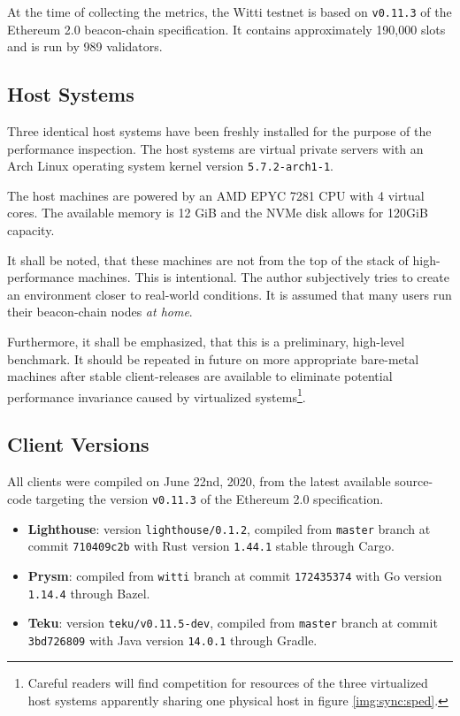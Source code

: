 \documentclass[twoside,twocolumn]{article}
\begin{document}
At the time of collecting the metrics, the Witti testnet is based on \texttt{v0.11.3} of the Ethereum 2.0 beacon-chain specification. It contains approximately 190,000 slots and is run by 989 validators.\par

\subsection{Host Systems}
Three identical host systems have been freshly installed for the purpose of the performance inspection. The host systems are virtual private servers with an Arch Linux operating system kernel version \texttt{5.7.2-arch1-1}.\par

The host machines are powered by an AMD EPYC 7281 CPU with 4 virtual cores. The available memory is 12 GiB and the NVMe disk allows for 120GiB capacity.\par

It shall be noted, that these machines are not from the top of the stack of high-performance machines. This is intentional. The author subjectively tries to create an environment closer to real-world conditions. It is assumed that many users run their beacon-chain nodes \textit{at home}.\par

Furthermore, it shall be emphasized, that this is a preliminary, high-level benchmark. It should be repeated in future on more appropriate bare-metal machines after stable client-releases are available to eliminate potential performance invariance caused by virtualized systems\footnote{Careful readers will find competition for resources of the three virtualized host systems apparently sharing one physical host in figure \ref{img:sync:sped}.}.\par

\subsection{Client Versions}
All clients were compiled on June 22nd, 2020, from the latest available source-code targeting the version \texttt{v0.11.3} of the Ethereum 2.0 specification.

\begin{itemize}
\item \textbf{Lighthouse}: version \texttt{lighthouse/0.1.2}, compiled from \texttt{master} branch at commit \texttt{710409c2b} with Rust version \texttt{1.44.1} stable through Cargo.
\item \textbf{Prysm}: compiled from \texttt{witti} branch at commit \texttt{172435374} with Go version \texttt{1.14.4} through Bazel.
\item \textbf{Teku}: version \texttt{teku/v0.11.5-dev}, compiled from \texttt{master} branch at commit \texttt{3bd726809} with Java version \texttt{14.0.1} through Gradle.
\end{itemize}
\end{document}
